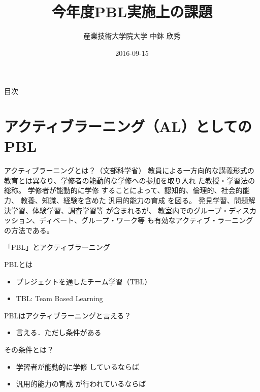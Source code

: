 \documentclass[uplatex,dvipdfmx,14pt,presentation,t]{beamer}
\author{産業技術大学院大学 \linebreak 中鉢 欣秀}
\date{2016-09-15}
\title{今年度PBL実施上の課題}
\begin{document}
\maketitle
\begin{frame}{目次}
\tableofcontents
\end{frame}


\section{アクティブラーニング（AL）としてのPBL}
\label{sec-1}
\begin{frame}[label=sec-1-1]{\normalsize アクティブラーニングとは？（文部科学省）}
教員による一方向的な講義形式の教育とは異なり、学修者の能動的な学修への参加を取り入れ
た教授・学習法の総称。 \alert{学修者が能動的に学修} することによって、認知的、倫理的、社会的能力、
教養、知識、経験を含めた \alert{汎用的能力の育成} を図る。
 発見学習、問題解決学習、体験学習、調査学習等
 が含まれるが、
 \alert{教室内でのグループ・ディスカッション、ディベート、グループ・ワーク等}
も有効なアクティブ・ラーニングの方法である。
\end{frame}
\begin{frame}[label=sec-1-2]{「PBL」とアクティブラーニング}
\begin{block}{PBLとは}
\begin{itemize}
\item プレジェクトを通したチーム学習（TBL）
\item TBL: Team Based Learning
\end{itemize}
\pause
\end{block}
\begin{block}{PBLはアクティブラーニングと言える？}
\begin{itemize}
\item 言える．ただし条件がある
\end{itemize}
\pause
\end{block}
\begin{block}{その条件とは？}
\begin{itemize}
\item \alert{学習者が能動的に学修} しているならば
\item \alert{汎用的能力の育成} が行われているならば
\end{itemize}
\end{block}
\end{frame}
\end{document}
